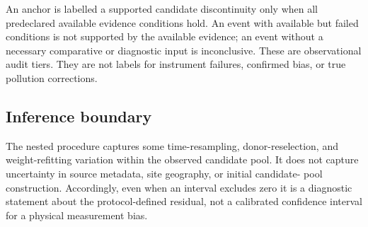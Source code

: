 An anchor is labelled a supported candidate discontinuity only when all
predeclared available evidence conditions hold. An event with available but
failed conditions is not supported by the available evidence; an event without
a necessary comparative or diagnostic input is inconclusive. These are
observational audit tiers. They are not labels for instrument failures,
confirmed bias, or true pollution corrections.

\subsection{Inference boundary}

The nested procedure captures some time-resampling, donor-reselection, and
weight-refitting variation within the observed candidate pool. It does not
capture uncertainty in source metadata, site geography, or initial candidate-
pool construction. Accordingly, even when an interval excludes zero it is a
diagnostic statement about the protocol-defined residual, not a calibrated
confidence interval for a physical measurement bias.
